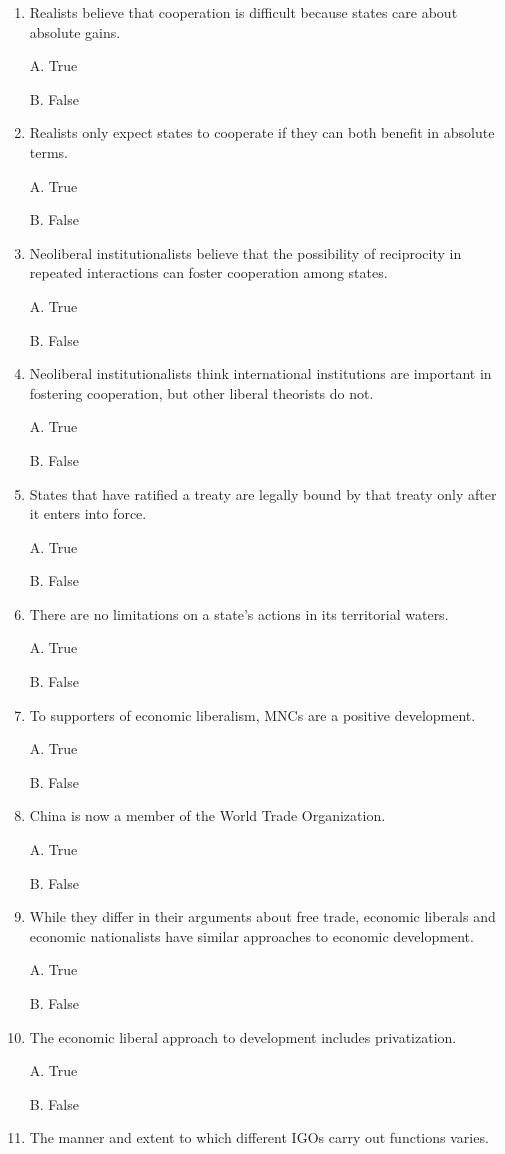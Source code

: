 \documentclass[
]{book}
\begin{document}
\begin{enumerate}
\def\labelenumi{\arabic{enumi}.}
\item
  Realists believe that cooperation is difficult because states care about absolute gains.

  A. True

  B. False
\item
  Realists only expect states to cooperate if they can both benefit in absolute terms.

  A. True

  B. False
\item
  Neoliberal institutionalists believe that the possibility of reciprocity in repeated interactions can foster cooperation among states.

  A. True

  B. False
\item
  Neoliberal institutionalists think international institutions are important in fostering cooperation, but other liberal theorists do not.

  A. True

  B. False
\item
  States that have ratified a treaty are legally bound by that treaty only after it enters into force.

  A. True

  B. False
\item
  There are no limitations on a state's actions in its territorial waters.

  A. True

  B. False
\item
  To supporters of economic liberalism, MNCs are a positive development.

  A. True

  B. False
\item
  China is now a member of the World Trade Organization.

  A. True

  B. False
\item
  While they differ in their arguments about free trade, economic liberals and economic nationalists have similar approaches to economic development.

  A. True

  B. False
\item
  The economic liberal approach to development includes privatization.

  A. True

  B. False
\item
  The manner and extent to which different IGOs carry out functions varies.


\end{enumerate}
\end{document}
